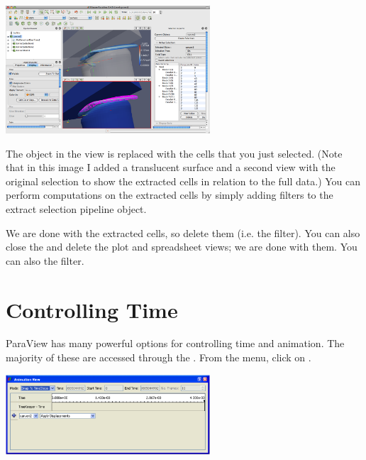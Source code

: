 \begin{inlinefig}
  \includegraphics[width=3in]{images/ExtractSelection}
\end{inlinefig}

The object in the view is replaced with the cells that you just
selected. (Note that in this image I added a translucent surface and a
second view with the original selection to show the extracted cells in
relation to the full data.) You can perform computations on the
extracted cells by simply adding filters to the extract selection pipeline
object.

We are done with the extracted cells, so delete them (i.e. \delete the
 filter).  You can also close the  and delete the plot and spreadsheet views; we are done with
them.  You can also \delete the  filter.


\section{Controlling Time}


ParaView has many powerful options for controlling time and animation.  The
majority of these are accessed through the .  From
the menu, click on  \ra {}.

\begin{inlinefig}
  \includegraphics[width=3in]{images/AnimationView}
\end{inlinefig}

